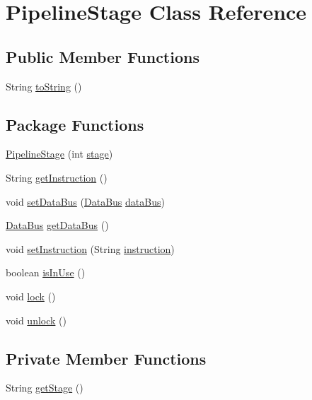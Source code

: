 \hypertarget{class_pipeline_stage}{}\section{Pipeline\+Stage Class Reference}
\label{class_pipeline_stage}
\subsection*{Public Member Functions}
\begin{DoxyCompactItemize}
\item 
String \mbox{\hyperlink{class_pipeline_stage_afe1a4701506f8257e53caff512af905d}{to\+String}} ()
\end{DoxyCompactItemize}
\subsection*{Package Functions}
\begin{DoxyCompactItemize}
\item 
\mbox{\hyperlink{class_pipeline_stage_af608b65a2a3bb7d9fcf3d860152104a2}{Pipeline\+Stage}} (int \mbox{\hyperlink{class_pipeline_stage_a8e9a5f7315a4d88213c4ad0949048f34}{stage}})
\item 
String \mbox{\hyperlink{class_pipeline_stage_a0716fd5bf42bb11790bf8ab6568dc22d}{get\+Instruction}} ()
\item 
void \mbox{\hyperlink{class_pipeline_stage_adc91fb5b9c859a597c6a889c822edb18}{set\+Data\+Bus}} (\mbox{\hyperlink{class_data_bus}{Data\+Bus}} \mbox{\hyperlink{class_pipeline_stage_abf7e2ce98acaa474f4be90e14fda0f26}{data\+Bus}})
\item 
\mbox{\hyperlink{class_data_bus}{Data\+Bus}} \mbox{\hyperlink{class_pipeline_stage_a132fd57aa34d80eb12ac7b228d29d32e}{get\+Data\+Bus}} ()
\item 
void \mbox{\hyperlink{class_pipeline_stage_a5bf1a125f39f8fbcce67d892b67c80af}{set\+Instruction}} (String \mbox{\hyperlink{class_pipeline_stage_a489ee0d4b3d0eee31ec60b9cb24a0e36}{instruction}})
\item 
boolean \mbox{\hyperlink{class_pipeline_stage_ae04dfe9641854b90cd470b1267425f0c}{is\+In\+Use}} ()
\item 
void \mbox{\hyperlink{class_pipeline_stage_a12c4e47d7abbf17c0042d4b41464fae0}{lock}} ()
\item 
void \mbox{\hyperlink{class_pipeline_stage_ade83daea8199744f2f6466f5cbd87330}{unlock}} ()
\end{DoxyCompactItemize}
\subsection*{Private Member Functions}
\begin{DoxyCompactItemize}
\item 
String \mbox{\hyperlink{class_pipeline_stage_a935e03d46a543f261995097c044fd655}{get\+Stage}} ()
\end{DoxyCompactItemize}
